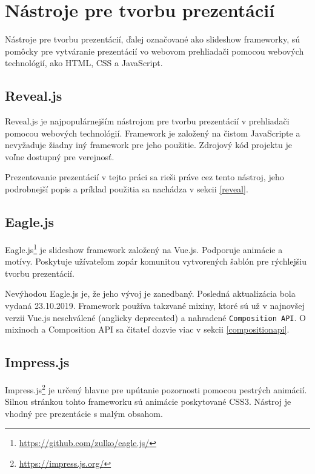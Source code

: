 \section{Nástroje pre tvorbu prezentácií}
Nástroje pre tvorbu prezentácií, ďalej označované ako slideshow frameworky, sú pomôcky pre vytváranie prezentácií vo webovom prehliadači pomocou webových technológií, ako HTML, CSS a JavaScript.

\subsection{Reveal.js}
Reveal.js je najpopulárnejším nástrojom pre tvorbu prezentácií v prehliadači pomocou webových technológií. Framework je založený na čistom JavaScripte a nevyžaduje žiadny iný framework pre jeho použitie. Zdrojový kód projektu je voľne dostupný pre verejnosť. 

Prezentovanie prezentácií v tejto práci sa rieši práve cez tento nástroj, jeho podrobnejší popis a príklad použitia sa nachádza v sekcii \ref{reveal}.

\subsection{Eagle.js}
Eagle.js\footnote{\url{https://github.com/zulko/eagle.js/}} je slideshow framework založený na Vue.js. Podporuje animácie a motívy. Poskytuje užívateľom zopár komunitou vytvorených šablón pre rýchlejšiu tvorbu prezentácií. 

Nevýhodou Eagle.js je, že jeho vývoj je zanedbaný. Posledná aktualizácia bola vydaná 23.10.2019. Framework používa takzvané mixiny, ktoré sú už v najnovšej verzii Vue.js neschválené (anglicky deprecated) a nahradené \texttt{Composition API}. O mixinoch a Composition API sa čitateľ dozvie viac v sekcii \ref{compositionapi}.

\subsection{Impress.js}
Impress.js\footnote{\url{https://impress.js.org/}} je určený hlavne pre upútanie pozornosti pomocou pestrých animácií. Silnou stránkou tohto frameworku sú animácie poskytované CSS3. Nástroj je vhodný pre prezentácie s malým obsahom.
